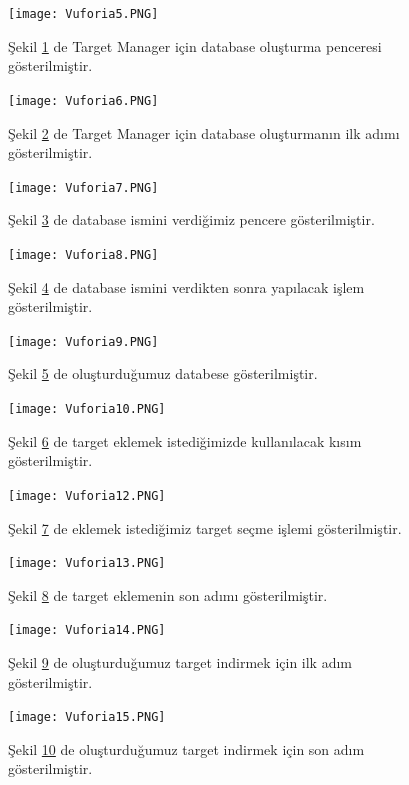 \documentclass[12pt, a4paper]{article}
\begin{document}
	\begin{figure}[!ht]
		\caption{}
		\centering
		\texttt{[image: Vuforia5.PNG]}
		
		\label{gantt3}
		Şekil \ref{gantt3} de Target Manager için database oluşturma penceresi gösterilmiştir\cite{Vuforia}.	
	\end{figure}
	\newpage
	\begin{figure}[!ht]
		\caption{}
		\centering
		\texttt{[image: Vuforia6.PNG]}
		
		\label{gantt4}
		Şekil \ref{gantt4} de Target Manager için database oluşturmanın ilk adımı gösterilmiştir\cite{Vuforia}.	
	\end{figure}
	\begin{figure}[!ht]
		\caption{}
		\centering
		\texttt{[image: Vuforia7.PNG]}
		
		\label{gantt5}
		Şekil \ref{gantt5} de  database ismini verdiğimiz pencere gösterilmiştir\cite{Vuforia}.	
	\end{figure}
	\begin{figure}[!ht]
		\caption{}
		\centering
		\texttt{[image: Vuforia8.PNG]}
		
		\label{gantt6}
		Şekil \ref{gantt6} de  database ismini verdikten sonra yapılacak işlem gösterilmiştir\cite{Vuforia}.	
	\end{figure}
	\newpage
	\begin{figure}[!ht]
		\caption{}
		\centering
		\texttt{[image: Vuforia9.PNG]}
		
		\label{gantt7}
		Şekil \ref{gantt7} de oluşturduğumuz databese gösterilmiştir\cite{Vuforia}.	
	\end{figure}
	\newpage
	\begin{figure}[!ht]
		\caption{}
		\centering
		\texttt{[image: Vuforia10.PNG]}
		
		\label{gantt8}
		Şekil \ref{gantt8} de target eklemek istediğimizde kullanılacak kısım gösterilmiştir\cite{Vuforia}.	
	\end{figure}
	\newpage
	\begin{figure}[!ht]
		\caption{}
		\centering
		\texttt{[image: Vuforia12.PNG]}
		
		\label{gantt9}
		Şekil \ref{gantt9} de eklemek istediğimiz target seçme işlemi gösterilmiştir\cite{Vuforia}.	
	\end{figure}
	\begin{figure}[!ht]
		\caption{}
		\centering
		\texttt{[image: Vuforia13.PNG]}
		
		\label{gantt10}
		Şekil \ref{gantt10} de target eklemenin son adımı gösterilmiştir\cite{Vuforia}.
	\end{figure}
	\begin{figure}[!ht]
		\caption{}
		\centering
		\texttt{[image: Vuforia14.PNG]}
		
		\label{gantt11}
		Şekil \ref{gantt11} de oluşturduğumuz target indirmek için ilk adım gösterilmiştir\cite{Vuforia}.
	\end{figure}
	\newpage
	\begin{figure}[!ht]
		\caption{}
		\centering
		\texttt{[image: Vuforia15.PNG]}
		
		\label{gantt12}
		Şekil \ref{gantt12} de oluşturduğumuz target indirmek için son adım gösterilmiştir\cite{Vuforia}.
	\end{figure}
\end{document}
